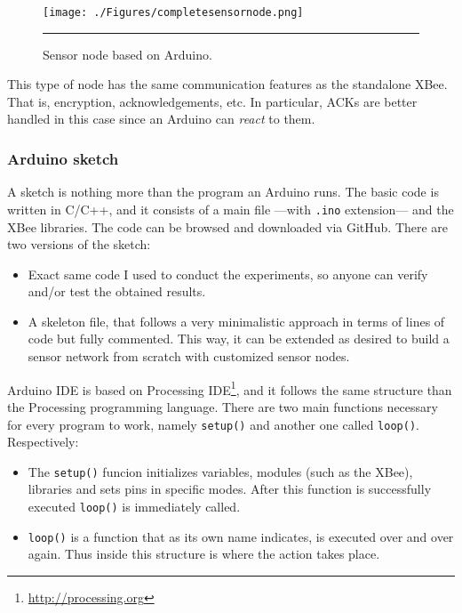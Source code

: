 \begin{figure}[htbp]
    \centering
        \texttt{[image: ./Figures/completesensornode.png]}
        \rule{35em}{0.5pt}
    \caption[Arduino-based node schematic]{Sensor node based on Arduino.}
    \label{fig:ArduinoNode}
\end{figure}

This type of node has the same communication features as the standalone XBee. That is, encryption, acknowledgements, etc. In particular, ACKs are better handled in this case since an Arduino can \emph{react} to them.

\subsubsection{Arduino sketch}
A sketch is nothing more than the program an Arduino runs. The basic code is written in C/C++, and it consists of a main file ---with \texttt{.ino} extension--- and the XBee\textregistered{} libraries. The code can be browsed and downloaded via GitHub. There are two versions of the sketch:

\begin{itemize}
    \item Exact same code I used to conduct the experiments, so anyone can verify and/or test the obtained results.
    \item A skeleton file, that follows a very minimalistic approach in terms of lines of code but fully commented. This way, it can be extended as desired to build a sensor network from scratch with customized sensor nodes.
\end{itemize}

Arduino IDE is based on Processing IDE\footnote{\url{http://processing.org}}, and it follows the same structure than the Processing programming language. There are two main functions necessary for every program to work, namely \texttt{setup()} and another one called \texttt{loop()}. Respectively:

\begin{itemize}
    \item The \texttt{setup()} funcion initializes variables, modules (such as the XBee), libraries and sets pins in specific modes. After this function is successfully executed \texttt{loop()} is immediately called.
    \item \texttt{loop()} is a function that as its own name indicates, is executed over and over again. Thus inside this structure is where the action takes place. 
\end{itemize}

